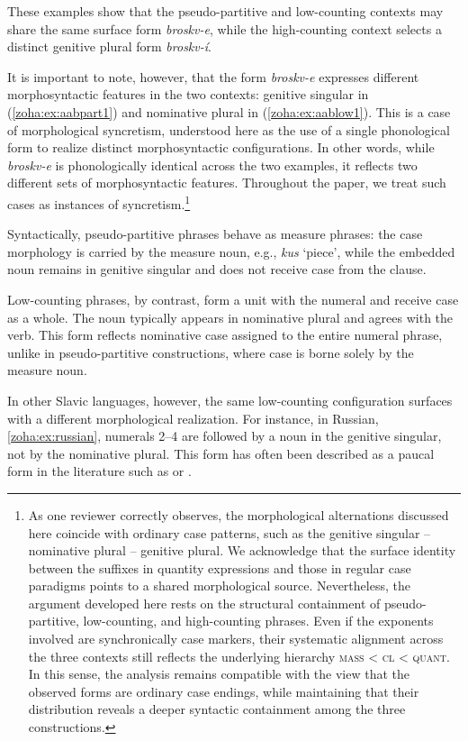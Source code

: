 \documentclass[output=paper,colorlinks,citecolor=brown
]{langscibook}
\begin{document}
\noindent These examples show that the pseudo-partitive and low-counting contexts may share the same surface form \textit{broskv-e}, while the high-counting context selects a distinct genitive plural form \textit{broskv-í}.

It is important to note, however, that the form \textit{broskv-e} expresses different morphosyntactic features in the two contexts: genitive singular in (\ref{zoha:ex:aabpart1}) and nominative plural in (\ref{zoha:ex:aablow1}). This is a case of morphological syncretism, understood here as the use of a single phonological form to realize distinct morphosyntactic configurations. In other words, while \textit{broskv-e} is phonologically identical across the two examples, it reflects two different sets of morphosyntactic features. Throughout the paper, we treat such cases as instances of syncretism.\footnote{As one reviewer correctly observes, the morphological alternations discussed here coincide with ordinary case patterns, such as the genitive singular -- nominative plural -- genitive plural. We acknowledge that the surface identity between the suffixes in quantity expressions and those in regular case paradigms points to a shared morphological source. Nevertheless, the argument developed here rests on the structural containment of pseudo-partitive, low-counting, and high-counting phrases. Even if the exponents involved are synchronically case markers, their systematic alignment across the three contexts still reflects the underlying hierarchy \textsc{mass} < \textsc{cl} < \textsc{quant}. In this sense, the analysis remains compatible with the view that the observed forms are ordinary case endings, while maintaining that their distribution reveals a deeper syntactic containment among the three constructions.}

Syntactically, pseudo-partitive phrases behave as measure phrases: the case morphology is carried by the measure noun, e.g., \textit{kus} `piece', while the embedded noun remains in genitive singular and does not receive case from the clause. 

Low-counting phrases, by contrast, form a unit with the numeral and receive case as a whole. The noun typically appears in nominative plural and agrees with the verb. This form reflects nominative case assigned to the entire numeral phrase, unlike in pseudo-partitive constructions, where case is borne solely by the measure noun.

In other Slavic languages, however, the same low-counting configuration surfaces with a different morphological realization. For instance, in Russian, \ref{zoha:ex:russian}, numerals 2–4 are followed by a noun in the genitive singular, not by the nominative plural. This form has often been described as a paucal form in the literature such as \citet{Franks1995} or \citet{Corbett2000}.
\end{document}
